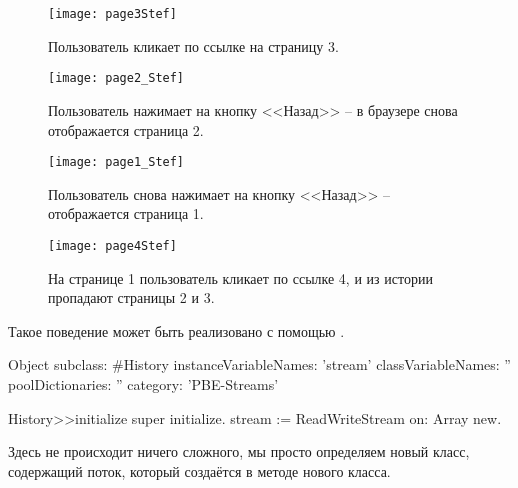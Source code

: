 \documentclass[a4paper,10pt,twoside]{book}
\begin{document}
\begin{figure}[!ht]
\centerline{\texttt{[image: page3Stef]}}
\caption{Пользователь кликает по ссылке на страницу 3.}
\vspace{.2in}
\end{figure}

\begin{figure}[!ht]
\centerline{\texttt{[image: page2\_Stef]}}
\caption{Пользователь нажимает на кнопку <<Назад>> -- в браузере снова отображается страница 2.}
\vspace{.2in}
\end{figure}

\begin{figure}[!ht]
\centerline{\texttt{[image: page1\_Stef]}}
\caption{Пользователь снова нажимает на кнопку <<Назад>> -- отображается страница 1.}
\vspace{.2in}
\end{figure}

\begin{figure}[!ht]
\centerline{\texttt{[image: page4Stef]}}
\caption{На странице 1 пользователь кликает по ссылке 4, и из истории пропадают страницы 2 и 3.}
\vspace{.2in}
\end{figure}

Такое поведение может быть реализовано с помощью .

\begin{code}{}
Object subclass: #History
  instanceVariableNames: 'stream'
  classVariableNames: ''
  poolDictionaries: ''
  category: 'PBE-Streams'

History>>initialize
    super initialize.
    stream := ReadWriteStream on: Array new.
\end{code}

Здесь не происходит ничего сложного, мы просто определяем новый класс, содержащий поток, который создаётся в методе  нового класса.
\end{document}
